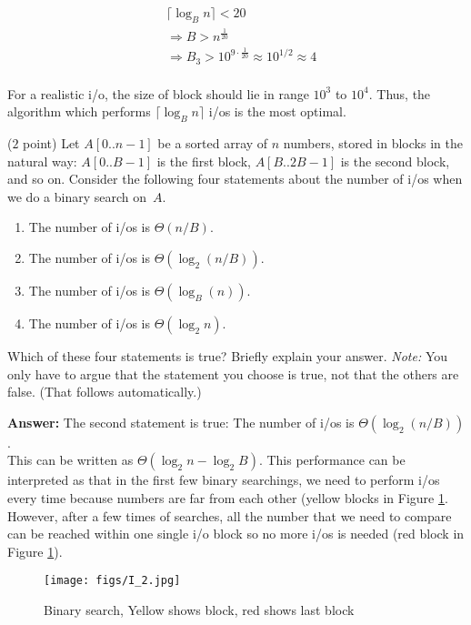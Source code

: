 \documentclass{article}
\newcommand{\io}{{\sc i/o}\xspace}
\newcommand{\ios}{{\io}s\xspace}
\newcounter{rcounter}
\newenvironment{rlist}%
{\begin{list}{\setnr-\arabic{rcounter}}{\usecounter{rcounter}}}{\end{list}}
\begin{document}
\begin{rlist}
\begin{enumerate}
\begin{align*}
                &\lceil \log_B n \rceil < 20\\
                &\Longrightarrow B > n^{\frac{1}{20}}\\
                &\Longrightarrow B_3 > 10^{9 \cdot \frac{1}{20}} \approx 10^{1/2} \approx 4\\
            \end{align*}
    \end{enumerate}
    For a realistic \io, the size of block should lie in range $10^3$ to $10^4$. Thus, the algorithm which performs $\lceil \log_B n \rceil$ \ios is the most optimal.
\item ($2$ point)
    Let $A[0..n-1]$ be a sorted array of $n$ numbers, stored in blocks in the natural way: $A[0..B-1]$ is the first block, $A[B..2B-1]$ is the second block, and so on. Consider the following four statements about the number of \ios when we do a binary search on~$A$.
    \begin{enumerate}
        \item[(I)]
            The number of \ios is $\Theta(n/B)$.
        \item[(II)]
            The number of \ios is $\Theta(\log_2 (n/B))$.
        \item[(III)]
            The number of \ios is $\Theta(\log_B(n))$.
        \item[(IV)]
            The number of \ios is $\Theta(\log_2 n)$.
    \end{enumerate}
    Which of these four statements is true? Briefly explain your answer. \emph{Note:} You only have to argue that the statement you choose is true, not that the others are false. (That follows automatically.)
    
    \textbf{Answer:}
    The second statement is true: The number of \ios is $\Theta(\log_2 (n/B))$.\\
    This can be written as $\Theta(\log_2n-\log_2B)$. This performance can be interpreted as that in the first few binary searchings, we need to perform \ios every time because numbers are far from each other (yellow blocks in Figure \ref{fig:bs}. However, after a few times of searches, all the number that we need to compare can be reached within one single \io block so no more \ios is needed (red block in Figure \ref{fig:bs}).
    \begin{figure}[h]
        \texttt{[image: figs/I\_2.jpg]}
        \caption{Binary search, Yellow shows block, red shows last block}
        \label{fig:bs}
    \end{figure}


\end{rlist}
\end{document}
